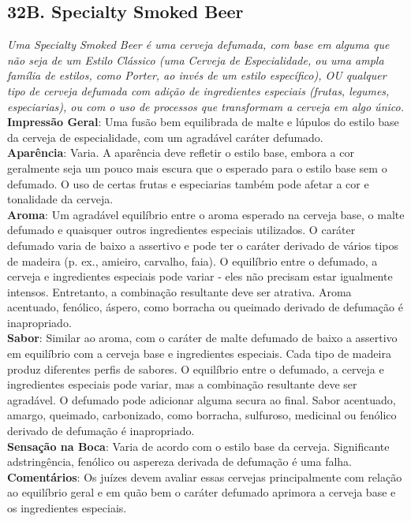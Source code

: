 \subsection*{32B. Specialty Smoked Beer}
\textit{Uma Specialty Smoked Beer é uma cerveja defumada, com base em alguma que não seja de um Estilo Clássico (uma Cerveja de Especialidade, ou uma ampla família de estilos, como Porter, ao invés de um estilo específico), OU qualquer tipo de cerveja defumada com adição de ingredientes especiais (frutas, legumes, especiarias), ou com o uso de processos que transformam a cerveja em algo único.}\\
\textbf{Impressão Geral}: Uma fusão bem equilibrada de malte e lúpulos do estilo base da cerveja de especialidade, com um agradável caráter defumado. \\
\textbf{Aparência}: Varia. A aparência deve refletir o estilo base, embora a cor geralmente seja um pouco mais escura que o esperado para o estilo base sem o defumado. O uso de certas frutas e especiarias também pode afetar a cor e tonalidade da cerveja. \\
\textbf{Aroma}: Um agradável equilíbrio entre o aroma esperado na cerveja base, o malte defumado e quaisquer outros ingredientes especiais utilizados. O caráter defumado varia de baixo a assertivo e pode ter o caráter derivado de vários tipos de madeira (p. ex., amieiro, carvalho, faia). O equilíbrio entre o defumado, a cerveja e ingredientes especiais pode variar - eles não precisam estar igualmente intensos. Entretanto, a combinação resultante deve ser atrativa. Aroma acentuado, fenólico, áspero, como borracha ou queimado derivado de defumação é inapropriado. \\
\textbf{Sabor}: Similar ao aroma, com o caráter de malte defumado de baixo a assertivo em equilíbrio com a cerveja base e ingredientes especiais. Cada tipo de madeira produz diferentes perfis de sabores. O equilíbrio entre o defumado, a cerveja e ingredientes especiais pode variar, mas a combinação resultante deve ser agradável. O defumado pode adicionar alguma secura ao final. Sabor acentuado, amargo, queimado, carbonizado, como borracha, sulfuroso, medicinal ou fenólico derivado de defumação é inapropriado. \\
\textbf{Sensação na Boca}: Varia de acordo com o estilo base da cerveja. Significante adstringência, fenólico ou aspereza derivada de defumação é uma falha. \\
\textbf{Comentários}: Os juízes devem avaliar essas cervejas principalmente com relação ao equilíbrio geral e em quão bem o caráter defumado aprimora a cerveja base e os ingredientes especiais. \\
